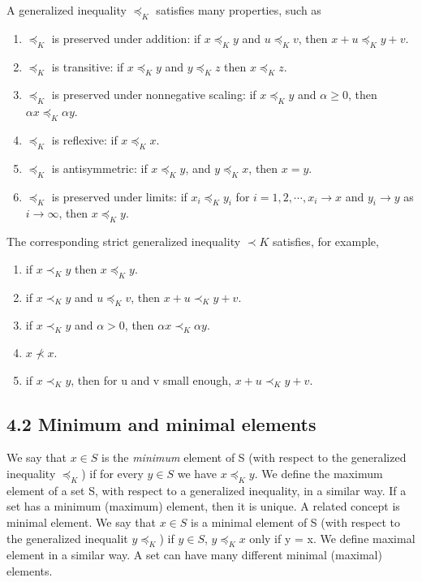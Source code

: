 \documentclass{article}
\begin{document}
A generalized inequality $\preceq_K$ satisfies many properties, such as

\begin{enumerate}
    \item $\preceq_K$ is preserved under addition: if $x \preceq_K y$ and $u \preceq_K v$, then $x+u \preceq_K y+v$.
    \item $\preceq_K$ is transitive: if $x \preceq_K y$ and $y \preceq_K z$ then $x \preceq_K z$.
    \item $\preceq_K$ is preserved under nonnegative scaling: if $x \preceq_K y$ and $\alpha\ge 0$, then $\alpha x \preceq_K \alpha y$.
    \item $\preceq_K$ is reflexive: if $x \preceq_K x$.
    \item $\preceq_K$ is antisymmetric: if $x \preceq_K y$, and $y \preceq_K x$, then $x=y$.
    \item $\preceq_K$ is preserved under limits: if $x_i \preceq_K y_i$ for $i=1,2,\cdots,x_i \rightarrow x$ and $y_i \rightarrow y$
    as $i \rightarrow \infty$, then $x \preceq_K y$.
\end{enumerate}

The corresponding strict generalized inequality $\prec K$ satisfies, for example,

\begin{enumerate}
    \item if $x\prec_K y$ then $x\preceq_K y$.
    \item if $x\prec_K y$ and $u\preceq_K v$, then $x+u\prec_K y+v$.
    \item if $x\prec_K y$ and $\alpha>0$, then $\alpha x\prec_K \alpha y$.
    \item $x\nprec x$.
    \item if $x\prec_K y$, then for u and v small enough, $x+u\prec_K y+v$.
\end{enumerate}

\subsection*{4.2 Minimum and minimal elements}

We say that $x \in S$ is the \textit{minimum} element of S (with respect to the generalized
inequality $\preceq_K$) if for every $y \in S$ we have $x \preceq_K y$. We define the maximum
element of a set S, with respect to a generalized inequality, in a similar way. If a
set has a minimum (maximum) element, then it is unique. A related concept is
minimal element. We say that $x \in S$ is a minimal element of S (with respect to
the generalized inequalit $y \preceq_K$) if $y \in S$, $y \preceq_K x$ only if y = x. We define maximal
element in a similar way. A set can have many different minimal (maximal)
elements.
\end{document}
